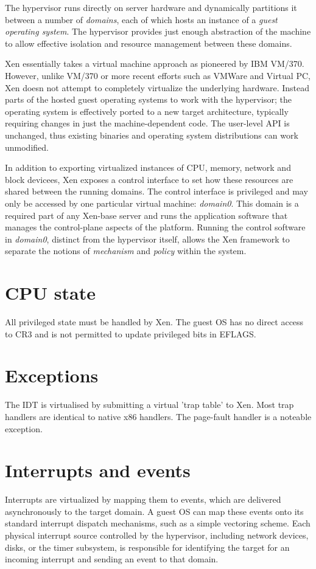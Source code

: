 \documentclass[11pt,twoside,final,openright]{xenstyle}
\begin{document}
The hypervisor runs directly on server hardware and dynamically partitions
it between a number of {\it domains}, each of which hosts an instance
of a {\it guest operating system}. The hypervisor provides just enough
abstraction of the machine to allow effective isolation and resource 
management between these domains.

Xen essentially takes a virtual machine approach as pioneered by IBM VM/370.
However, unlike VM/370 or more recent efforts such as VMWare and Virtual PC,
Xen doesn not attempt to completely virtualize the underlying hardware. Instead
parts of the hosted guest operating systems to work with the hypervisor; the
operating system is effectively ported to a new target architecture, typically
requiring changes in just the machine-dependent code. The user-level API is
unchanged, thus existing binaries and operating system distributions can work
unmodified.

In addition to exporting virtualized instances of CPU, memory, network and
block devicees, Xen exposes a control interface to set how these resources
are shared between the running domains. The control interface is privileged
and may only be accessed by one particular virtual machine: {\it domain0}.
This domain is a required part of any Xen-base server and runs the application
software that manages the control-plane aspects of the platform. Running the
control software in {\it domain0}, distinct from the hypervisor itself, allows
the Xen framework to separate the notions of {\it mechanism} and {\it policy}
within the system.


\chapter{CPU state}

All privileged state must be handled by Xen. The guest OS has no direct access
to CR3 and is not permitted to update privileged bits in EFLAGS.

\chapter{Exceptions}
The IDT is virtualised by submitting a virtual 'trap
table' to Xen. Most trap handlers are identical to native x86
handlers. The page-fault handler is a noteable exception.

\chapter{Interrupts and events}
Interrupts are virtualized by mapping them to events, which are delivered 
asynchronously to the target domain. A guest OS can map these events onto
its standard interrupt dispatch mechanisms, such as a simple vectoring 
scheme. Each physical interrupt source controlled by the hypervisor, including
network devices, disks, or the timer subsystem, is responsible for identifying
the target for an incoming interrupt and sending an event to that domain.
\end{document}

